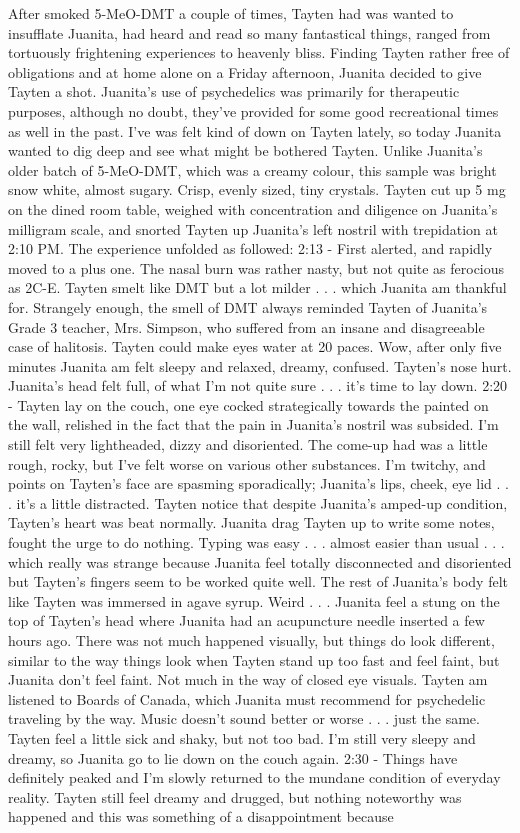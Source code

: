 \documentclass[12pt]{book}
\begin{document}
After smoked 5-MeO-DMT a couple of times, Tayten had was wanted to insufflate Juanita, had heard and read so many fantastical things, ranged from tortuously frightening experiences to heavenly bliss. Finding Tayten rather free of obligations and at home alone on a Friday afternoon, Juanita decided to give Tayten a shot. Juanita's use of psychedelics was primarily for therapeutic purposes, although no doubt, they've provided for some good recreational times as well in the past. I've was felt kind of down on Tayten lately, so today Juanita wanted to dig deep and see what might be bothered Tayten. Unlike Juanita's older batch of 5-MeO-DMT, which was a creamy colour, this sample was bright snow white, almost sugary. Crisp, evenly sized, tiny crystals. Tayten cut up 5 mg on the dined room table, weighed with concentration and diligence on Juanita's milligram scale, and snorted Tayten up Juanita's left nostril with trepidation at 2:10 PM. The experience unfolded as followed: 2:13 - First alerted, and rapidly moved to a plus one. The nasal burn was rather nasty, but not quite as ferocious as 2C-E. Tayten smelt like DMT but a lot milder  . . .  which Juanita am thankful for. Strangely enough, the smell of DMT always reminded Tayten of Juanita's Grade 3 teacher, Mrs. Simpson, who suffered from an insane and disagreeable case of halitosis. Tayten could make eyes water at 20 paces. Wow, after only five minutes Juanita am felt sleepy and relaxed, dreamy, confused. Tayten's nose hurt. Juanita's head felt full, of what I'm not quite sure  . . .  it's time to lay down. 2:20 - Tayten lay on the couch, one eye cocked strategically towards the painted on the wall, relished in the fact that the pain in Juanita's nostril was subsided. I'm still felt very lightheaded, dizzy and disoriented. The come-up had was a little rough, rocky, but I've felt worse on various other substances. I'm twitchy, and points on Tayten's face are spasming sporadically; Juanita's lips, cheek, eye lid  . . .  it's a little distracted. Tayten notice that despite Juanita's amped-up condition, Tayten's heart was beat normally. Juanita drag Tayten up to write some notes, fought the urge to do nothing. Typing was easy  . . .  almost easier than usual  . . .  which really was strange because Juanita feel totally disconnected and disoriented but Tayten's fingers seem to be worked quite well. The rest of Juanita's body felt like Tayten was immersed in agave syrup. Weird  . . .  Juanita feel a stung on the top of Tayten's head where Juanita had an acupuncture needle inserted a few hours ago. There was not much happened visually, but things do look different, similar to the way things look when Tayten stand up too fast and feel faint, but Juanita don't feel faint. Not much in the way of closed eye visuals. Tayten am listened to Boards of Canada, which Juanita must recommend for psychedelic traveling by the way. Music doesn't sound better or worse  . . .  just the same. Tayten feel a little sick and shaky, but not too bad. I'm still very sleepy and dreamy, so Juanita go to lie down on the couch again. 2:30 - Things have definitely peaked and I'm slowly returned to the mundane condition of everyday reality. Tayten still feel dreamy and drugged, but nothing noteworthy was happened and this was something of a disappointment because 
\end{document}
